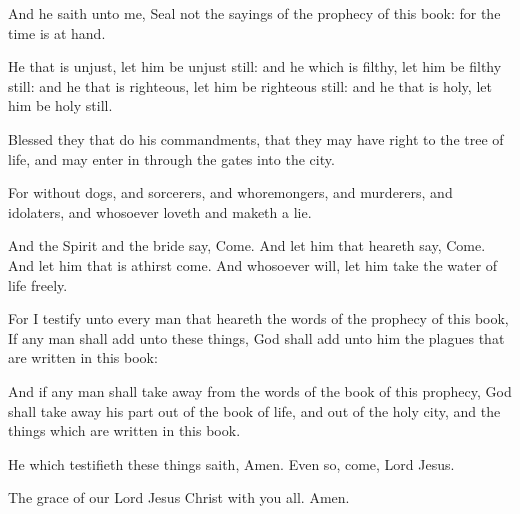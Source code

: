 {And he
saith unto
me,
Seal
not the
sayings of the
prophecy of
this
book:
for the
time
is at
hand.

He that is
unjust, let him be
unjust
still:
and he which is
filthy, let him be
filthy
still:
and he that is
righteous, let him be
righteous
still:
and he that is
holy, let him be
holy
still.



Blessed
{}
they that
do
his
commandments,
that
they may
have
right
to the
tree of
life,
and may enter
in through the
gates
into the
city.

For
without
{}
dogs,
and
sorcerers,
and
whoremongers,
and
murderers,
and
idolaters,
and
whosoever
loveth
and
maketh a
lie.


And the
Spirit
and the
bride
say,
Come.
And let him that
heareth
say,
Come.
And let him that is
athirst
come.
And whosoever
will, let him
take the
water of
life
freely.


\par }{\PP {}For I
testify unto every
man that
heareth the
words of the
prophecy of
this
book,
If any
man shall
add
unto these
things,
God shall
add
unto
him the
plagues that are
written
in
this
book:

And
if any
man shall take
away
from the
words of the
book of
this
prophecy,
God shall take
away
his
part
out of the
book of
life,
and out
of the
holy
city,
and
{} the
things which are
written
in
this
book.

He
which
testifieth these
things
saith,
{}
Amen. Even
so,
come,
Lord
Jesus.

The
grace of
our
Lord
Jesus
Christ
{}
with
you
all.
Amen.


\par }